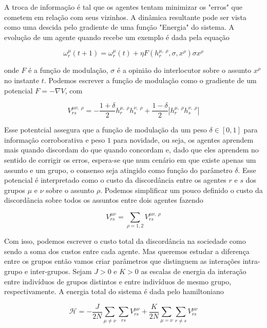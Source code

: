 \documentclass[a4paper, 11pt]{article} %
\newcommand{\agent}[2]{%
    \omega^{#2}_{#1}}
\newcommand{\subpot}{\ensuremath{\displaystyle%
    V_{rs}^{\mu \nu,\; \rho}}}
\newcommand{\pot}{\ensuremath{\displaystyle%
    V_{rs}^{\mu \nu}}}
\newcommand{\opn}[2]{\ensuremath{\displaystyle%
    h^{#2,\;\rho}_{#1}}}
\renewcommand{\H}{%
    \mathcal{H}}
\begin{document}
A troca de informação é tal que os agentes tentam minimizar os "erros" que
cometem em relação com seus vizinhos. A dinâmica resultante pode ser vista como
uma descida pelo gradiente de uma função "Energia" do sistema. A evolução de um
agente quando recebe um exemplo é dada pela equação

\begin{equation}
    \agent{r}{\mu}(t+1)=\agent{r}{\mu}(t)+\eta F(\opn{r}{\mu},\sigma, x^{\rho})
    \sigma x^{\rho}
\end{equation}

onde $F$ é a função de modulação, $\sigma$ é a opinião do interlocutor sobre o
assunto $x^{\rho}$ no instante $t$. Podemos escrever a função de modulação como o
gradiente de um potencial $ F = -\nabla V $, com

\begin{equation}\label{subject-potential}
    \subpot = -\frac{1+\delta}{2}\opn{r}{\mu}\opn{s}{\nu}
                      +\frac{1-\delta}{2}|\opn{r}{\mu}\opn{s}{\nu}|
\end{equation}

Esse potentcial assegura que a função de modulação da um peso $\delta \in [0,1]$
para informação corroborativa e peso $1$ para novidade, ou seja, os agentes
aprendem mais quando discordam do que quando concordam e, dado que eles aprendem
no sentido de corrigir os erros, espera-se que num cenário em que existe apenas
um assunto e um grupo, o consenso seja atingido como função do parâmetro
$\delta$. Esse potencial é interpretado como o custo da discordância entre os
agentes $r$ e $s$ dos grupos $\mu$ e $\nu$ sobre o assunto $\rho$. Podemos
simplificar um pouco definido o custo da discordância sobre todos os assuntos
entre dois agentes fazendo 

\begin{equation}\label{pair-potential}
    \pot = \sum_{\rho=1,2} \subpot
\end{equation}

Com isso, podemos escrever o custo total da discordância na sociedade como sendo
a soma dos custos entre cada agente. Mas queremos estudar a diferença entre os
grupos então vamos criar parâmetros que distinguem as interações intra-grupo e
inter-grupos. Sejam $J>0$ e $K>0$ as escalas de energia da interação entre
indivíduos de grupos distintos e entre indivíduos de mesmo grupo,
respectivamente. A energia total do sistema é dada pelo hamiltoniano

\begin{equation}
    \H = -\frac{J}{2N}\sum_{\mu \ne \nu}\sum_{rs}\pot
                 +\frac{K}{2N}\sum_{\mu=\nu}\sum_{r\ne s}\pot
\end{equation}
\end{document}
